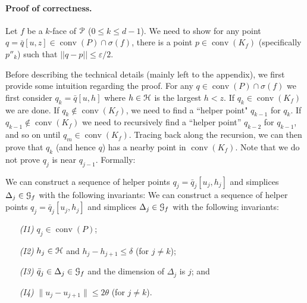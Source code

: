 \documentclass[11pt]{myclass}
\newcommand{\eps}{\varepsilon}
\renewcommand{\c}[1]{\ensuremath{\EuScript{#1}}}
\newcommand{\conv}[1]{\mathop{\mathrm{conv}}(#1)}
\newcommand{\polyt}{\EuScript{P}}
\newcommand{\fq}{\bar{q}}
\newcommand{\point}[3]{{#1}[#3,#2]}
\begin{document}
\paragraph{Proof of correctness.} 
Let $f$ be a $k$-face of $\polyt$ ($0\leq k\leq d-1$). We need to show for any point $q = \point{\fq}{z}{u} \in \conv{P} \cap \sigma(f)$, there is a point $p \in \conv{K_f}$ (specifically $p''_k$) such that $||q - p|| \leq \eps/2$.  

Before describing the technical details (mainly left to the appendix), we first provide some intuition regarding the proof.  For any $q \in \conv{P} \cap \sigma(f)$ we first consider $q_k = \point{\fq}{h}{u}$ where $h \in \c{H}$ is the largest $h<z$.  If $q_k \in \conv{K_f}$ we are done.  If $q_k \notin \conv{K_f}$, we need to find a ``helper point" $q_{k-1}$ for $q_k$.  If $q_{k-1} \notin \conv{K_f}$ we need to recursively find a ``helper point'' $q_{k-2}$ for $q_{k-1}$, and so on until $q_m \in \conv{K_f}$.  
Tracing back along the recursion, we can then prove that $q_k$ (and hence $q$) has a nearby point in $\conv{K_f}$.
Note that we do not prove $q_j$ is near $q_{j-1}$.  Formally:

\begin{lemma}
\label{lem:helper}
We can construct a sequence of helper points $q_j = \point{\fq_j}{h_j}{u_j}$ and simplices $\Delta_j \in \c{G}_f$ with the following invariants:
We can construct a sequence of helper points $q_j = \point{\fq_j}{h_j}{u_j}$ and simplices $\Delta_j \in \c{G}_f$ with the following invariants:
   \begin{itemize} \denselist 
     \item[\emph{(I1)}] $q_j\in \conv{P}$;
     \item[\emph{(I2)}] $h_j \in \c{H}$ and $h_j - h_{j+1} \leq \delta$ (for $j\neq k$);
     \item[\emph{(I3)}] $\fq_j \in \Delta_j \in \c{G}_f$ and the dimension of $\Delta_j$ is $j$; and 
     \item[\emph{(I4)}] $\| u_j -u_{j+1}\| \leq 2\theta$ (for $j\neq k$). 
   \end{itemize}
\end{lemma}
\end{document}
